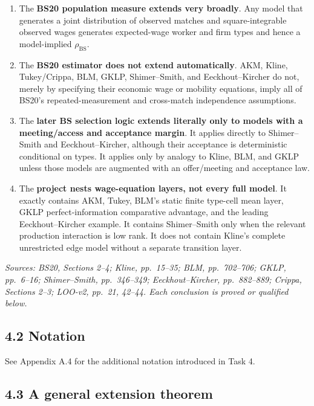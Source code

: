 \documentclass[11pt]{article}
\begin{document}
\begin{enumerate}
\item The \textbf{BS20 population measure extends very broadly}.  Any model
  that generates a joint distribution of observed matches and square-integrable
  observed wages generates expected-wage worker and firm types and hence a
  model-implied \(\rho_{\mathrm{BS}}\).
\item The \textbf{BS20 estimator does not extend automatically}.  AKM, Kline,
  Tukey/Crippa, BLM, GKLP, Shimer--Smith, and Eeckhout--Kircher do not, merely
  by specifying their economic wage or mobility equations, imply all of
  BS20's repeated-measurement and cross-match independence assumptions.
\item The \textbf{later BS selection logic extends literally only to models
  with a meeting/access and acceptance margin}.  It applies directly to
  Shimer--Smith and Eeckhout--Kircher, although their acceptance is
  deterministic conditional on types.  It applies only by analogy to Kline,
  BLM, and GKLP unless those models are augmented with an offer/meeting and
  acceptance law.
\item The \textbf{project nests wage-equation layers, not every full model}.
  It exactly contains AKM, Tukey, BLM's static finite type-cell mean layer,
  GKLP perfect-information comparative advantage, and the leading
  Eeckhout--Kircher example.  It contains Shimer--Smith only when the relevant
  production interaction is low rank.  It does not contain Kline's complete
  unrestricted edge model without a separate transition layer.
\end{enumerate}

\textit{Sources: BS20, Sections 2--4; Kline, pp.\ 15--35; BLM,
pp.\ 702--706; GKLP, pp.\ 6--16; Shimer--Smith, pp.\ 346--349;
Eeckhout--Kircher, pp.\ 882--889; Crippa, Sections 2--3; LOO-v2,
pp.\ 21, 42--44.  Each conclusion is proved or qualified below.}

\subsection{4.2 Notation}

See Appendix A.4 for the additional notation introduced in Task 4.

\subsection{4.3 A general extension theorem}
\end{document}
